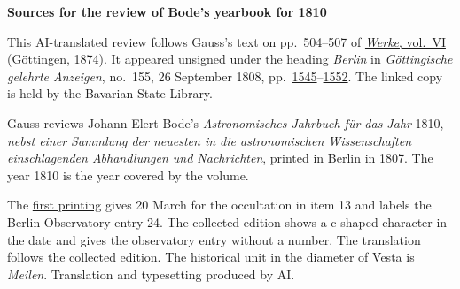 \clearpage\thispagestyle{empty}
\begin{center}\textbf{Sources for the review of Bode’s yearbook for 1810}\end{center}
\noindent This AI-translated review follows Gauss’s text on pp.~504--507 of \href{https://gdz.sub.uni-goettingen.de/id/PPN236007467}{\textit{Werke}, vol.~VI} (Göttingen, 1874). It appeared unsigned under the heading \emph{Berlin} in \textit{Göttingische gelehrte Anzeigen}, no.~155, 26 September 1808, pp.~\href{https://api.digitale-sammlungen.de/iiif/image/v2/bsb10538674_00515/full/1800,/0/default.jpg}{1545}--\href{https://api.digitale-sammlungen.de/iiif/image/v2/bsb10538674_00522/full/1800,/0/default.jpg}{1552}. The linked copy is held by the Bavarian State Library.
\par\smallskip\noindent Gauss reviews Johann Elert Bode’s \emph{Astronomisches Jahrbuch für das Jahr} 1810, \emph{nebst einer Sammlung der neuesten in die astronomischen Wissenschaften einschlagenden Abhandlungen und Nachrichten}, printed in Berlin in 1807. The year 1810 is the year covered by the volume.
\par\smallskip\noindent The \href{https://api.digitale-sammlungen.de/iiif/image/v2/bsb10538674_00521/full/1800,/0/default.jpg}{first printing} gives 20 March for the occultation in item 13 and labels the Berlin Observatory entry 24. The collected edition shows a c-shaped character in the date and gives the observatory entry without a number. The translation follows the collected edition. The historical unit in the diameter of Vesta is \emph{Meilen}. Translation and typesetting produced by AI.
\clearpage
